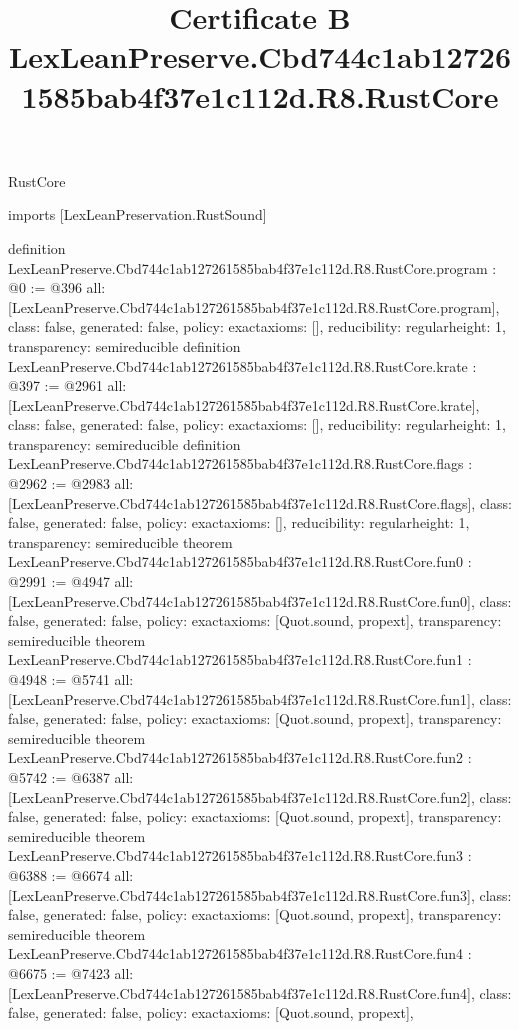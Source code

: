 \begin{lexlean}{RustCore}
\title{Certificate B LexLeanPreserve.Cbd744c1ab127261585bab4f37e1c112d.R8.RustCore}
\begin{coremodule}
imports [LexLeanPreservation.RustSound]

definition LexLeanPreserve.Cbd744c1ab127261585bab4f37e1c112d.R8.RustCore.program : @0 := @396 {
  all: [LexLeanPreserve.Cbd744c1ab127261585bab4f37e1c112d.R8.RustCore.program],
  class: false,
  generated: false,
  policy: exact{axioms: []},
  reducibility: regular{height: 1},
  transparency: semireducible
}
definition LexLeanPreserve.Cbd744c1ab127261585bab4f37e1c112d.R8.RustCore.krate : @397 := @2961 {
  all: [LexLeanPreserve.Cbd744c1ab127261585bab4f37e1c112d.R8.RustCore.krate],
  class: false,
  generated: false,
  policy: exact{axioms: []},
  reducibility: regular{height: 1},
  transparency: semireducible
}
definition LexLeanPreserve.Cbd744c1ab127261585bab4f37e1c112d.R8.RustCore.flags : @2962 := @2983 {
  all: [LexLeanPreserve.Cbd744c1ab127261585bab4f37e1c112d.R8.RustCore.flags],
  class: false,
  generated: false,
  policy: exact{axioms: []},
  reducibility: regular{height: 1},
  transparency: semireducible
}
theorem LexLeanPreserve.Cbd744c1ab127261585bab4f37e1c112d.R8.RustCore.fun0 : @2991 := @4947 {
  all: [LexLeanPreserve.Cbd744c1ab127261585bab4f37e1c112d.R8.RustCore.fun0],
  class: false,
  generated: false,
  policy: exact{axioms: [Quot.sound, propext]},
  transparency: semireducible
}
theorem LexLeanPreserve.Cbd744c1ab127261585bab4f37e1c112d.R8.RustCore.fun1 : @4948 := @5741 {
  all: [LexLeanPreserve.Cbd744c1ab127261585bab4f37e1c112d.R8.RustCore.fun1],
  class: false,
  generated: false,
  policy: exact{axioms: [Quot.sound, propext]},
  transparency: semireducible
}
theorem LexLeanPreserve.Cbd744c1ab127261585bab4f37e1c112d.R8.RustCore.fun2 : @5742 := @6387 {
  all: [LexLeanPreserve.Cbd744c1ab127261585bab4f37e1c112d.R8.RustCore.fun2],
  class: false,
  generated: false,
  policy: exact{axioms: [Quot.sound, propext]},
  transparency: semireducible
}
theorem LexLeanPreserve.Cbd744c1ab127261585bab4f37e1c112d.R8.RustCore.fun3 : @6388 := @6674 {
  all: [LexLeanPreserve.Cbd744c1ab127261585bab4f37e1c112d.R8.RustCore.fun3],
  class: false,
  generated: false,
  policy: exact{axioms: [Quot.sound, propext]},
  transparency: semireducible
}
theorem LexLeanPreserve.Cbd744c1ab127261585bab4f37e1c112d.R8.RustCore.fun4 : @6675 := @7423 {
  all: [LexLeanPreserve.Cbd744c1ab127261585bab4f37e1c112d.R8.RustCore.fun4],
  class: false,
  generated: false,
  policy: exact{axioms: [Quot.sound, propext]},
}
\end{coremodule}
\end{lexlean}
